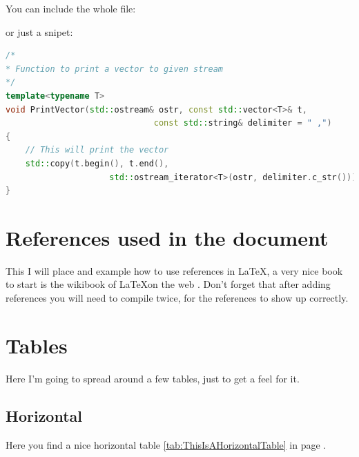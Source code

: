 \documentclass[12pt, a4paper,twoside]{article}
\begin{document}
You can include the whole file:

or just a snipet:
\begin{lstlisting}[language={C++},caption={Snippet of C++ code  included in the text},label={cod:cpp}]
/*
* Function to print a vector to given stream
*/
template<typename T>
void PrintVector(std::ostream& ostr, const std::vector<T>& t, 
                              const std::string& delimiter = " ,")
{
    // This will print the vector
    std::copy(t.begin(), t.end(), 
                     std::ostream_iterator<T>(ostr, delimiter.c_str()));
}
\end{lstlisting}

\section{References used in the document}

This I will place and example how to use references in \LaTeX, a very nice book to start is the wikibook of \LaTeX on the web \cite{bib:wikibook}. Don't forget that after adding references you will need to compile twice, for the references to show up correctly.

\section{Tables}
Here I'm going to spread around a few tables, just to get a feel for it.
\subsection{Horizontal}
Here you find a nice horizontal table \ref{tab:ThisIsAHorizontalTable} in page \pageref{tab:ThisIsAHorizontalTable}.
\end{document}
